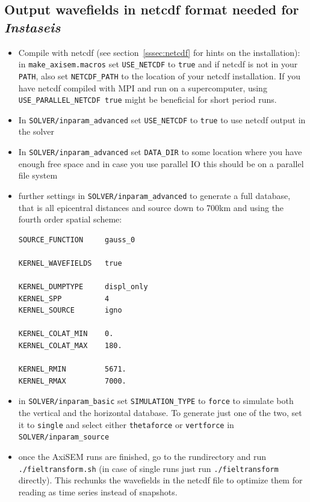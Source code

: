 \documentclass{article}
\begin{document}
\subsection{Output wavefields in netcdf format needed for \textit{Instaseis}}

\begin{itemize}
    \item Compile with netcdf (see section~\ref{sssec:netcdf} for hints on the
    installation): in \verb|make_axisem.macros| set \verb|USE_NETCDF| to \verb|true|
    and if netcdf is not in your \verb|PATH|, also set \verb|NETCDF_PATH| to the location
    of your netcdf installation. If you have netcdf compiled with MPI and run on a
    supercomputer, using \verb|USE_PARALLEL_NETCDF true| might be beneficial for short
    period runs.
    \item In \verb|SOLVER/inparam_advanced| set \verb|USE_NETCDF| to \verb|true| to
    use netcdf output in the solver
    \item In \verb|SOLVER/inparam_advanced| set \verb|DATA_DIR| to some location where you
    have enough free space and in case you use parallel IO this should be on a parallel
    file system
    \item further settings in \verb|SOLVER/inparam_advanced| to generate a full database,
    that is all epicentral distances and source down to 700km and using the fourth order
    spatial scheme:

\begin{verbatim}
SOURCE_FUNCTION     gauss_0

KERNEL_WAVEFIELDS   true

KERNEL_DUMPTYPE     displ_only
KERNEL_SPP          4
KERNEL_SOURCE       igno

KERNEL_COLAT_MIN    0.
KERNEL_COLAT_MAX    180.

KERNEL_RMIN         5671.
KERNEL_RMAX         7000.
\end{verbatim}

    \item in \verb|SOLVER/inparam_basic| set \verb|SIMULATION_TYPE| to \verb|force| to
    simulate both the vertical and the horizontal database. To generate just one of the
    two, set it to \verb|single| and select either \verb|thetaforce| or \verb|vertforce|
    in \\\verb|SOLVER/inparam_source|

    \item once the AxiSEM runs are finished, go to the rundirectory and run
    \verb|./fieltransform.sh| (in case of single runs just run \verb|./fieltransform|
    directly). This rechunks the wavefields in the netcdf file to optimize them for
    reading as time series instead of snapshots.

\end{itemize}
\end{document}
